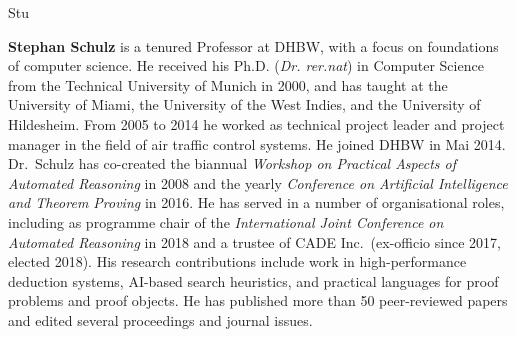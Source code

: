 \begin{sitedescription}{Stu}
\begin{compactitem}
\item \textbf{Stephan Schulz} is a tenured Professor at DHBW, with a
  focus on foundations of computer science. He received his
  Ph.D. (\emph{Dr. rer.nat}) in Computer Science from the Technical
  University of Munich in 2000, and has taught at the University of
  Miami, the University of the West Indies, and the University of
  Hildesheim. From 2005 to 2014 he worked as technical project leader
  and project manager in the field of air traffic control systems. He
  joined DHBW in Mai 2014. Dr.\ Schulz has co-created the biannual
  \emph{Workshop on Practical Aspects of Automated Reasoning} in 2008
  and the yearly \emph{Conference on Artificial Intelligence and
    Theorem Proving} in 2016. He has served in a number of
  organisational roles, including as programme chair of the
  \emph{International Joint Conference on Automated Reasoning} in 2018
  and a trustee of CADE Inc.\ (ex-officio since 2017, elected
  2018). His research contributions include work in high-performance
  deduction systems, AI-based search heuristics, and practical
  languages for proof problems and proof objects. He has published
  more than 50 peer-reviewed papers and edited several proceedings and
  journal issues.
\end{compactitem}

\end{sitedescription}

